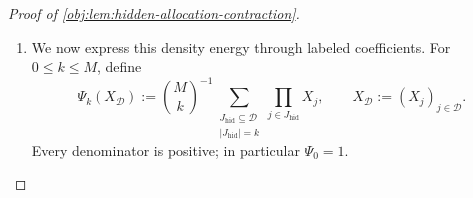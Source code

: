 \begin{proof}[Proof of \cref{obj:lem:hidden-allocation-contraction}]
\begin{enumerate}
Expanding the coefficient-extraction formula in
\cref{obj:lem:block-law} and applying this count gives the exact identity
\[
\lambda_{+1,h}(y\mid H,z)
=
\frac1{|\mathfrak C_H|}
\sum_{(\mathcal D_\ell)\in\mathfrak C_H}
\prod_{\ell=1}^B
f\left(
y_\ell-\frac h{2d}
\left(A_\ell(z)+\sum_{j\in\mathcal D_\ell}X_j(z)\right)
\right).
\]
Thus the conditional density is the uniform-completion average of the original labeled row densities.

If \(g_d(y_\ell)=0\), every translated density contributing to its nonnegative finite mixture is zero. The last display then gives
\(\lambda_{+1,h}(y\mid H,z)=0\). Consequently a version of the likelihood is
\[
L_+(z,y)
=
\begin{cases}
\displaystyle
\frac{\lambda_{+1,h}(y\mid H,z)}
{\prod_{\ell=1}^B g_d(y_\ell)},
&\prod_{\ell=1}^B g_d(y_\ell)>0,\\[6pt]
0,&\prod_{\ell=1}^B g_d(y_\ell)=0.
\end{cases}
\]
The response reference assigns full measure to the first case. The conditional density identification and the product form of \(Q_H\) therefore yield
\[
\chi_H^2
=
\int_{\mathbb R^B}
\int_{\{0,1\}^V}
\bigl(L_+(z,y)-1\bigr)^2
\,\mu_{\mathrm{ass}}(dz)\,\nu_{\mathrm{resp}}(dy).
\]
Finite channel expansions are bounded, so the integral rearrangements below are justified. Multiplying this identity by the remaining-capacity indicator preserves it almost surely under the actual graph marginal.

\item We now express this density energy through labeled coefficients. For
\(0\le k\le M\), define
\[
\Psi_k(X_{\mathcal D})
:=
\binom Mk^{-1}
\sum_{\substack{J_{\mathrm{hid}}\subseteq\mathcal D\\
|J_{\mathrm{hid}}|=k}}
\prod_{j\in J_{\mathrm{hid}}}X_j,
\qquad
X_{\mathcal D}:=(X_j)_{j\in\mathcal D}.
\]
Every denominator is positive; in particular \(\Psi_0=1\).


\end{enumerate}
\end{proof}
